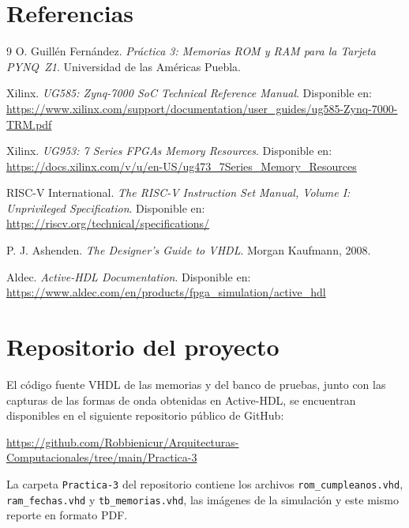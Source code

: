 \documentclass[12pt,letterpaper]{article}
\begin{document}
\section{Referencias}
\begin{thebibliography}{9}
O. Guillén Fernández. \textit{Práctica 3: Memorias ROM y RAM para la Tarjeta PYNQ~Z1}. Universidad de las Américas Puebla.

Xilinx. \textit{UG585: Zynq-7000 SoC Technical Reference Manual}. Disponible en: \url{https://www.xilinx.com/support/documentation/user_guides/ug585-Zynq-7000-TRM.pdf}

Xilinx. \textit{UG953: 7 Series FPGAs Memory Resources}. Disponible en: \url{https://docs.xilinx.com/v/u/en-US/ug473_7Series_Memory_Resources}

RISC-V International. \textit{The RISC-V Instruction Set Manual, Volume I: Unprivileged Specification}. Disponible en: \url{https://riscv.org/technical/specifications/}

P. J. Ashenden. \textit{The Designer's Guide to VHDL}. Morgan Kaufmann, 2008.

Aldec. \textit{Active-HDL Documentation}. Disponible en: \url{https://www.aldec.com/en/products/fpga_simulation/active_hdl}
\end{thebibliography}

\section*{Repositorio del proyecto}

El código fuente VHDL de las memorias y del banco de pruebas, junto con las capturas de las formas de onda obtenidas en Active-HDL, se encuentran disponibles en el siguiente repositorio público de GitHub:
\begin{center}
\url{https://github.com/Robbienicur/Arquitecturas-Computacionales/tree/main/Practica-3}
\end{center}
La carpeta \texttt{Practica-3} del repositorio contiene los archivos \texttt{rom\_cumpleanos.vhd}, \texttt{ram\_fechas.vhd} y \texttt{tb\_memorias.vhd}, las imágenes de la simulación y este mismo reporte en formato PDF.
\end{document}
